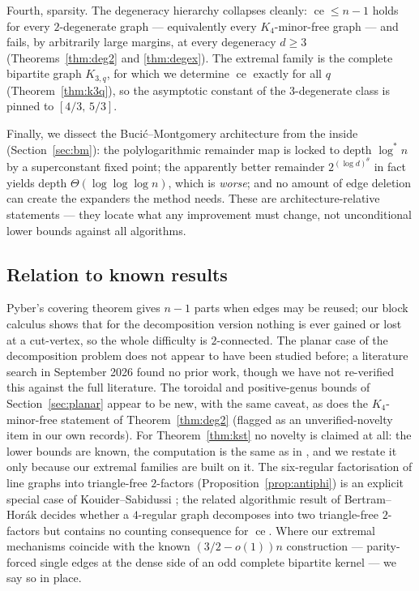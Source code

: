 \documentclass[a4paper,11pt]{amsart}
\theoremstyle{definition}
\theoremstyle{remark}
\newcommand{\ce}{\operatorname{ce}}
\begin{document}
Fourth, sparsity. The degeneracy hierarchy collapses cleanly: $\ce\le n-1$ holds for every
$2$-degenerate graph --- equivalently every $K_4$-minor-free graph --- and fails, by arbitrarily large
margins, at every degeneracy $d\ge3$ (Theorems~\ref{thm:deg2} and \ref{thm:degex}). The extremal family is
the complete bipartite graph $K_{3,q}$, for which we determine $\ce$ exactly for all $q$
(Theorem~\ref{thm:k3q}), so the asymptotic constant of the $3$-degenerate class is pinned to $[4/3,\,5/3]$.

Finally, we dissect the Buci\'c--Montgomery architecture from the inside (Section~\ref{sec:bm}): the
polylogarithmic remainder map is locked to depth $\log^* n$ by a superconstant fixed point; the apparently
better remainder $2^{(\log d)^\theta}$ in fact yields depth $\Theta(\log\log\log n)$, which is
\emph{worse}; and no amount of edge deletion can create the expanders the method needs. These are
architecture-relative statements --- they locate what any improvement must change, not unconditional lower
bounds against all algorithms.

\subsection{Relation to known results}

Pyber's covering theorem \cite{Py85} gives $n-1$ parts when edges may be reused; our block calculus shows
that for the decomposition version nothing is ever gained or lost at a cut-vertex, so the whole difficulty
is $2$-connected. The planar case of the decomposition problem does not appear to have been studied before;
a literature search in September 2026 found no prior work, though we have not re-verified this against the
full literature. The toroidal and positive-genus bounds of Section~\ref{sec:planar} appear to be new, with
the same caveat, as does the $K_4$-minor-free statement of Theorem~\ref{thm:deg2} (flagged as an
unverified-novelty item in our own records). For Theorem~\ref{thm:kst} no novelty is claimed at all: the
lower bounds are known, the computation is the same as in \cite{BM22,E83}, and we restate it only because
our extremal families are built on it. The six-regular factorisation of line graphs into triangle-free
$2$-factors (Proposition~\ref{prop:antiphi}) is an explicit special case of Kouider--Sabidussi
\cite{KS95}; the related algorithmic result of Bertram--Hor\'ak \cite{BH97} decides whether a
$4$-regular graph decomposes into two triangle-free $2$-factors but contains no counting consequence for
$\ce$. Where our extremal mechanisms coincide with the known $(3/2-o(1))n$ construction --- parity-forced
single edges at the dense side of an odd complete bipartite kernel --- we say so in place.
\end{document}
